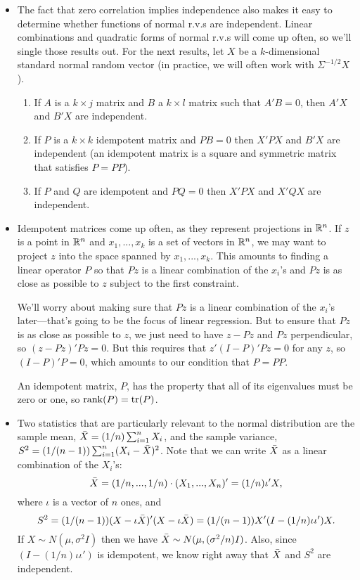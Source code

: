 \begin{itemize}[leftmargin=0pt]
\item The fact that zero correlation implies independence also makes
  it easy to determine whether functions of normal r.v.s are
  independent.  Linear combinations and quadratic forms of normal
  r.v.s will come up often, so we'll single those results out.  For
  the next results, let $X$ be a $k$-dimensional standard normal
  random vector (in practice, we will often work with $\Sigma^{-1/2} X$).
  \begin{enumerate}
  \item If $A$ is a $k \times j$ matrix and $B$ a $k \times l$ matrix such that
    $A'B = 0$, then $A'X$ and $B'X$ are independent.
  \item If $P$ is a $k \times k$ idempotent matrix and $PB = 0$ then $X'PX$
    and $B'X$ are independent (an idempotent matrix is a square and
    symmetric matrix that satisfies $P = PP$).
  \item If $P$ and $Q$ are idempotent and $PQ = 0$ then $X'PX$ and
    $X'QX$ are independent.
  \end{enumerate}
  
\item Idempotent matrices come up often, as they represent projections
  in $\mathbb{R}^n$.  If $z$ is a point in $\mathbb{R}^n$ and $x_1,...,x_k$ is a set of
  vectors in $\mathbb{R}^n$, we may want to project $z$ into the space spanned
  by $x_1,...,x_k$.  This amounts to finding a linear operator $P$ so
  that $P z$ is a linear combination of the $x_i$'s and $P z$ is as
  close as possible to $z$ subject to the first constraint.

  We'll worry about making sure that $Pz$ is a linear combination of
  the $x_i$'s later---that's going to be the focus of linear regression.
  But to ensure that $P z$ is as close as possible to $z$, we just
  need to have $z - Pz$ and $Pz$ perpendicular, so $(z - Pz)' Pz = 0$.
  But this requires that $z'(I - P)'P z = 0$ for any $z$, so $(I -
  P)'P = 0$, which amounts to our condition that $P = PP$.

  An idempotent matrix, $P$, has the property that all of its
  eigenvalues must be zero or one, so $\operatorname{rank}(P) = \operatorname{tr}(P)$.

\item Two statistics that are particularly relevant to the normal
  distribution are the sample mean, $\bar{X} = (1/n) \sum_{i=1}^n X_i$, and
  the sample variance, $S^2 = (1/(n-1)) \sum_{i=1}^n (X_i - \bar{X})^2$.  Note
  that we can write $\bar{X}$ as a linear combination of the $X_i$'s:
  \begin{equation*}
    \bar{X} = (1/n,...,1/n) \cdot (X_1,...,X_n)' = (1/n) \iota'X,
  \end{equation*}
  where $\iota$ is a vector of $n$ ones, and
  \begin{equation*}
    S^2 = (1/(n-1)) (X - \iota \bar{X})'(X - \iota \bar{X}) = (1/(n-1)) X'(I - (1/n) \iota\iota')X.
  \end{equation*}
  If $X \sim N(\mu, \sigma^2 I)$ then we have $\bar{X} \sim N(\mu, (\sigma^2/n) I)$.  Also,
  since $(I - (1/n) \iota\iota')$ is idempotent, we know right away that $\bar{X}$
  and $S^2$ are independent.


\end{itemize}
